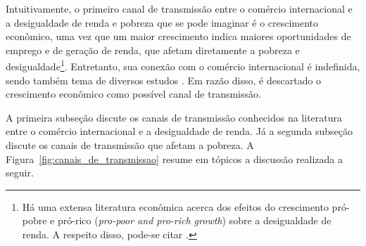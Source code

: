 Intuitivamente, o primeiro canal de transmissão entre o comércio internacional e a desigualdade de renda e pobreza que se pode imaginar é o crescimento econômico, uma vez que um maior crescimento indica maiores oportunidades de emprego e de geração de renda, que afetam diretamente a pobreza e desigualdade\footnote{Há uma extensa literatura econômica acerca dos efeitos do crescimento pró-pobre e pró-rico (\textit{pro-poor and pro-rich growth}) sobre a desigualdade de renda. A respeito disso, pode-se citar \textcite{ravallion04, thorbecke22}.}. Entretanto, sua conexão com o comércio internacional é indefinida, sendo também tema de diversos estudos \cite{anderson16, dix17, gnangnon18}. Em razão disso, é descartado o crescimento econômico como possível canal de transmissão. 

A primeira subseção discute os canais de transmissão conhecidos na literatura entre o comércio internacional e a desigualdade de renda. Já a segunda subseção discute os canais de transmissão que afetam a pobreza. A Figura~\ref{fig:canais_de_transmissao} resume em tópicos a discussão realizada a seguir.


